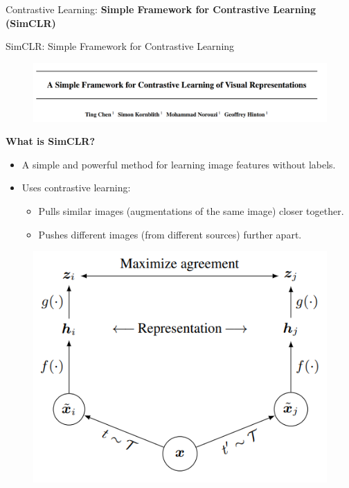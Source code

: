 \begin{frame}{}
    \LARGE Contrastive Learning: \textbf{Simple Framework for Contrastive Learning (SimCLR)}
\end{frame}

\begin{frame}[allowframebreaks]{SimCLR: Simple Framework for Contrastive Learning}
\begin{figure}
    \centering
    \includegraphics[width=\linewidth,height=0.9\textheight,keepaspectratio]{images/contrastive/slide_72_1_img.png}
\end{figure}

\framebreak

\textbf{What is SimCLR?}
\begin{itemize}
    \item A simple and powerful method for learning image features without labels.
    \item Uses contrastive learning:
    \begin{itemize}
        \item Pulls similar images (augmentations of the same image) closer together.
        \item Pushes different images (from different sources) further apart.
    \end{itemize}
\end{itemize}

\framebreak

\begin{figure}
    \centering
    \includegraphics[width=\linewidth,height=0.9\textheight,keepaspectratio]{images/contrastive/slide_73_1_img.png}
\end{figure}


\end{frame}
